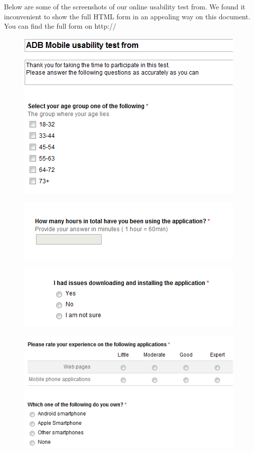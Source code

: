 Below are some of the screenshots of our online usability test from. We found
it inconvenient to show the full HTML form in an appealing way on this
document.  You can find the full form on http://


\begin{figure}[htb]
    \centering
    \includegraphics[width=1.0\textwidth]{ut_pic/1.png}
    \label{label: Usability test form item 1}
\end{figure}
\newpage
\begin{figure}[htb]
    \centering
    \includegraphics[width=1.0\textwidth]{ut_pic/4.png}
    \label{label: Usability test form item 1}
\end{figure}

\begin{figure}[htb]
    \centering
    \includegraphics[width=1.0\textwidth]{ut_pic/3.png}
    \label{label: Usability test form item 1}
\end{figure}

\begin{figure}[htb]
    \centering
    \includegraphics[width=1.0\textwidth]{ut_pic/2.png}
    \label{label: Usability test form item 1}
\end{figure}
\newpage 

